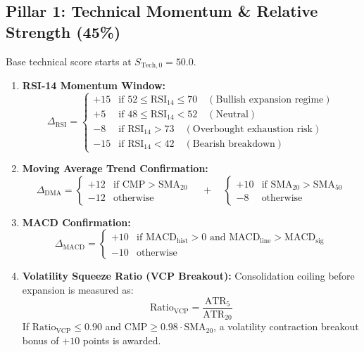 \documentclass[11pt,a4paper]{article}
\begin{document}
\subsection{Pillar 1: Technical Momentum \& Relative Strength (45\%)}
Base technical score starts at $S_{\text{Tech}, 0} = 50.0$.
\begin{enumerate}
    \item \textbf{RSI-14 Momentum Window:}
    \begin{equation}
    \Delta_{\text{RSI}} = \begin{cases}
    +15 & \text{if } 52 \le \text{RSI}_{14} \le 70 \quad (\text{Bullish expansion regime}) \\
    +5 & \text{if } 48 \le \text{RSI}_{14} < 52 \quad (\text{Neutral}) \\
    -8 & \text{if } \text{RSI}_{14} > 73 \quad (\text{Overbought exhaustion risk}) \\
    -15 & \text{if } \text{RSI}_{14} < 42 \quad (\text{Bearish breakdown})
    \end{cases}
    \end{equation}
    
    \item \textbf{Moving Average Trend Confirmation:}
    \begin{equation}
    \Delta_{\text{DMA}} = \begin{cases} +12 & \text{if } \text{CMP} > \text{SMA}_{20} \\ -12 & \text{otherwise} \end{cases}
    \quad + \quad
    \begin{cases} +10 & \text{if } \text{SMA}_{20} > \text{SMA}_{50} \\ -8 & \text{otherwise} \end{cases}
    \end{equation}
    
    \item \textbf{MACD Confirmation:}
    \begin{equation}
    \Delta_{\text{MACD}} = \begin{cases} +10 & \text{if } \text{MACD}_{\text{hist}} > 0 \text{ and } \text{MACD}_{\text{line}} > \text{MACD}_{\text{sig}} \\ -10 & \text{otherwise} \end{cases}
    \end{equation}

    \item \textbf{Volatility Squeeze Ratio (VCP Breakout):}
    Consolidation coiling before expansion is measured as:
    \begin{equation}
    \text{Ratio}_{\text{VCP}} = \frac{\text{ATR}_{5}}{\text{ATR}_{20}}
    \end{equation}
    If $\text{Ratio}_{\text{VCP}} \le 0.90$ and $\text{CMP} \ge 0.98 \cdot \text{SMA}_{20}$, a volatility contraction breakout bonus of $+10$ points is awarded.


\end{enumerate}
\end{document}
